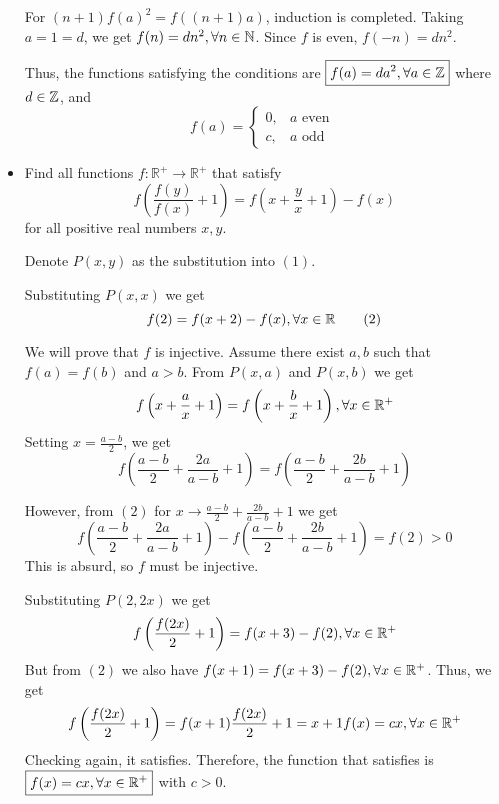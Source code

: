 \documentclass[11pt]{scrartcl}
\begin{document}
\begin{itemize}[label=, leftmargin=0em, itemsep=0.2em]
\begin{sol}
        For \( (n + 1)f(a)^2 = f((n + 1)a) \), induction is completed. Taking \( a = 1 = d \), we get \( f(n) = dn^2, \forall n \in \mathbb{N} \). Since \( f \) is even, \( f(-n) = dn^2 \).

        Thus, the functions satisfying the conditions are \( \boxed{f(a) = da^2, \forall a \in \mathbb{Z}} \) where \( d \in \mathbb{Z} \), and 
        \[
        \boxed{ f(a)=
        \left\{\begin{array}{rr}0,&a \text{ even }\\
            c,&a \text{ odd }
        \end{array}
        \right.
        }
        \]
    \end{sol}
    
    
    \item \begin{bt}
        Find all functions $f: \mathbb{R^+} \to \mathbb{R^+}$ that satisfy
        \[f\left(\frac{f(y)}{f(x)}+1\right)=f\left(x+\frac{y}{x}+1\right)-f(x)\]
        for all positive real numbers $x,y$.
    \end{bt}
    \begin{sol}
        Denote $P(x,y)$ as the substitution into $(1)$.

        Substituting $P(x,x)$ we get \[f(2) = f(x + 2) - f(x), \forall x\in \mathbb{R} \tag{2}\]

        We will prove that $f$ is injective. Assume there exist $a,b$ such that $f(a) = f(b)$ and $a > b$. From $P(x,a)$ and $P(x,b)$ we get 
        \[
            f\left(x + \frac{a}{x} + 1\right) = f\left(x + \frac{b}{x} + 1\right), \xro
        \]
        Setting $x = \frac{a - b}{2}$, we get 
        \[
            f\left(\frac{a - b}{2} + \frac{2a}{a - b} + 1\right) = f\left(\frac{a - b}{2} + \frac{2b}{a - b} + 1\right)
        \]

        However, from $(2)$ for $x \to \frac{a - b}{2} + \frac{2b}{a - b} + 1$ we get
        \[
        f\left(\frac{a - b}{2} + \frac{2a}{a - b} + 1\right) - f\left(\frac{a - b}{2} + \frac{2b}{a - b} + 1\right) = f(2) > 0
        \]
        This is absurd, so $f$ must be injective.

        Substituting $P(2,2x)$ we get 
        \[
            f\left(\frac{f(2x)}{2} + 1\right) = f(x + 3) - f(2), \xro
        \]
        But from $(2)$ we also have $f(x + 1 ) = f(x + 3) - f(2), \forall x\in \mathbb{R^+}$. Thus, we get
        \[
            f\left(\frac{f(2x)}{2} + 1\right) = f(x + 1 ) \ra \frac{f(2x)}{2} + 1 = x + 1  \ra f(x) = cx, \xro
        \]
        Checking again, it satisfies. Therefore, the function that satisfies is $\boxed{f(x) = cx, \forall x\in \mathbb{R^+}}$ with $c > 0$.


\end{sol}
\end{itemize}
\end{document}
